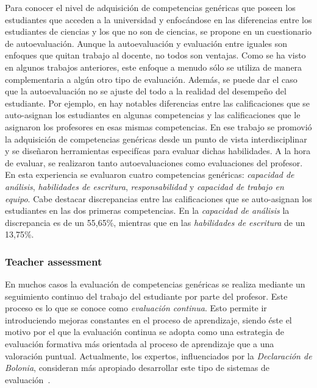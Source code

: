 Para conocer el nivel de adquisición de competencias genéricas que poseen los estudiantes que acceden a la universidad y enfocándose en las diferencias entre los estudiantes de ciencias y los que no son de ciencias, se propone en \cite{so2011mapping} un cuestionario de autoevaluación. Aunque la autoevaluación y evaluación entre iguales son enfoques que quitan trabajo al docente, no todos son ventajas. Como se ha visto en algunos trabajos anteriores, este enfoque a menudo sólo se utiliza de manera complementaria a algún otro tipo de evaluación. Además, se puede dar el caso que la autoevaluación no se ajuste del todo a la realidad del desempeño del estudiante. Por ejemplo, en \cite{carreras2013promotion} hay notables diferencias entre las calificaciones que se auto-asignan los estudiantes en algunas competencias y las calificaciones que le asignaron los profesores en esas mismas competencias. En ese trabajo se promovió la adquisición de competencias genéricas desde un punto de vista interdisciplinar y se diseñaron herramientas especifícas para evaluar dichas habilidades. A la hora de evaluar, se realizaron tanto autoevaluaciones como evaluaciones del profesor. En esta experiencia se evaluaron cuatro competencias genéricas: \emph{capacidad de análisis},  \emph{habilidades de escritura}, \emph{responsabilidad} y \emph{capacidad de trabajo en equipo}. Cabe destacar discrepancias entre las calificaciones que se auto-asignan los estudiantes en las dos primeras competencias. En la \emph{capacidad de análisis} la discrepancia es de un 55,65\%, mientras que en las \emph{habilidades de escritura} de un 13,75\%.



\subsubsection{Teacher assessment}

En muchos casos la evaluación de competencias genéricas se realiza mediante un seguimiento continuo del trabajo del estudiante por parte del profesor. Este proceso es lo que se conoce como \emph{evaluación continua}. Esto permite ir introduciendo mejoras constantes en el proceso de aprendizaje, siendo éste el motivo por el que la evaluación continua se adopta como una estrategia de evaluación formativa más orientada al proceso de aprendizaje que a una valoración puntual. Actualmente, los expertos, influenciados por la \emph{Declaración de Bolonia}, consideran más apropiado desarrollar este tipo de sistemas de evaluación~\cite{garcia2005competencias}. 

